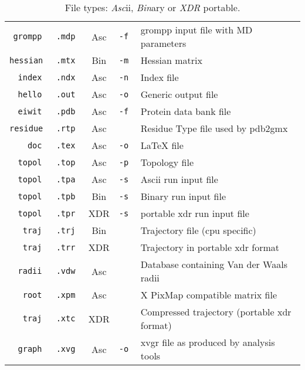 \begin{table}[p]
\begin{tabularx}{\linewidth}{rlccX}
\tt  grompp &\tt .mdp & Asc &\tt -f & grompp input file with MD parameters \\
\tt hessian &\tt .mtx & Bin &\tt -m & Hessian matrix \\
\tt   index &\tt .ndx & Asc &\tt -n & Index file \\
\tt   hello &\tt .out & Asc &\tt -o & Generic output file \\
\tt   eiwit &\tt .pdb & Asc &\tt -f & Protein data bank file \\
\tt residue &\tt .rtp & Asc &\tt    & Residue Type file used by pdb2gmx \\
\tt     doc &\tt .tex & Asc &\tt -o & LaTeX file \\
\tt   topol &\tt .top & Asc &\tt -p & Topology file \\
\tt   topol &\tt .tpa & Asc &\tt -s & Ascii run input file \\
\tt   topol &\tt .tpb & Bin &\tt -s & Binary run input file \\
\tt   topol &\tt .tpr & XDR &\tt -s & portable xdr run input file \\
\tt    traj &\tt .trj & Bin &\tt    & Trajectory file (cpu specific) \\
\tt    traj &\tt .trr & XDR &\tt    & Trajectory in portable xdr format \\
\tt   radii &\tt .vdw & Asc &\tt    & Database containing Van der Waals radii \\
\tt    root &\tt .xpm & Asc &\tt    & X PixMap compatible matrix file \\
\tt    traj &\tt .xtc & XDR &\tt    & Compressed trajectory (portable xdr format)\\
\tt   graph &\tt .xvg & Asc &\tt -o & xvgr file as produced by analysis tools \\
\hline
\end{tabularx}
\caption{File types: {\em Asc\/}ii, {\em Bin\/}ary or {\em XDR\/} portable.}
\label{Tab:form}
\end{table}
